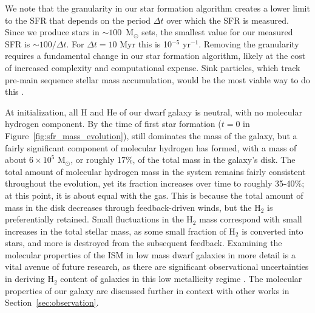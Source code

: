 \documentclass[twocolumn]{aastex61}
\begin{document}
We note that the granularity in our star formation algorithm creates a lower limit to the SFR that depends on the period $\Delta t$ over which the SFR is measured. Since we produce stars in $\sim 100$~M$_{\odot}$ sets, the smallest value for our measured SFR is $\sim 100/ \Delta t$. For $\Delta t = 10$ Myr this is 10$^{-5}$ yr$^{-1}$. Removing the granularity requires a fundamental change in our star formation algorithm, likely at the cost of increased complexity and computational expense. Sink particles, which track pre-main sequence stellar mass accumulation, would be the most viable way to do this \citep[see for example ][]{Krumholz2004,Federrath2010,GongOstriker2013,BleulerTeyssier2014,Sormani2017}.

At initialization, all H and He of our dwarf galaxy is neutral, with no molecular hydrogen component. By the time of first star formation ($t=0$ in Figure~\ref{fig:sfr_mass_evolution}),  still dominates the mass of the galaxy, but a fairly significant component of molecular hydrogen has formed, with a mass of about $6 \times 10^5$ M$_{\odot}$, or roughly 17\%, of the total mass in the galaxy's disk. The total amount of molecular hydrogen mass in the system remains fairly consistent throughout the evolution, yet its fraction increases over time to roughly 35-40\%; at this point, it is about equal with the  gas. This is because the total amount of mass in the disk decreases through feedback-driven winds, but the H$_2$ is preferentially retained. Small fluctuations in the H$_2$ mass correspond with small increases in the total stellar mass, as some small fraction of H$_2$ is converted into stars, and more is destroyed from the subsequent feedback. Examining the molecular properties of the ISM in low mass dwarf galaxies in more detail is a vital avenue of future research, as there are significant observational uncertainties in deriving H$_2$ content of galaxies in this low metallicity regime \citep{Leroy2008,McQuinn2012,Amorin2016}. The molecular properties of our galaxy are discussed further in context with other works in Section~\ref{sec:observation}. 
\end{document}
